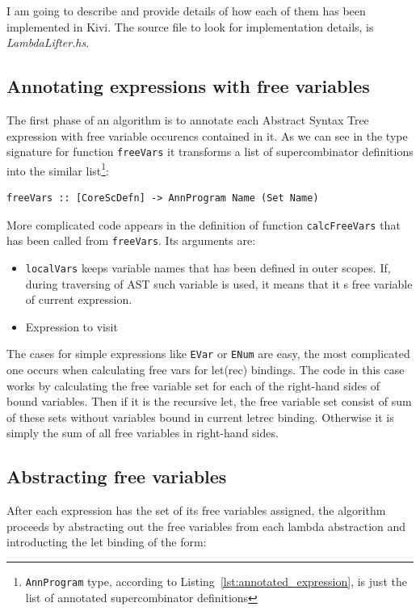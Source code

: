 \documentclass[12pt,a4paper]{report}
\begin{document}
I am going to describe and provide details of how each of them has been
implemented in Kivi. The source file to look for implementation details, is
\textit{LambdaLifter.hs}.

\subsection{Annotating expressions with free variables}
The first phase of an algorithm is to annotate each Abstract Syntax Tree
expression with free variable occurencs contained in it. As we can see in the
type signature for function \texttt{freeVars} it transforms a list of
supercombinator definitions into the similar list\footnote{\texttt{AnnProgram}
type, according to Listing~\ref{lst:annotated_expression}, is just the list of
annotated supercombinator definitions}:

\vspace*{0.2in}
\begin{lstlisting}[style=haskell]
freeVars :: [CoreScDefn] -> AnnProgram Name (Set Name)
\end{lstlisting}

More complicated code appears in the definition of function
\texttt{calcFreeVars} that has been called from \texttt{freeVars}. Its
arguments are:
\begin{itemize}
  \item \texttt{localVars} keeps variable names that has been defined in outer
    scopes. If, during traversing of AST such variable is used, it means that
    it s free variable of current expression.
  \item Expression to visit
\end{itemize}

The cases for simple expressions like \texttt{EVar} or \texttt{ENum} are easy,
the most complicated one occurs when calculating free vars for
let(rec) bindings. The code in this case works by calculating the free
variable set for each of the right-hand sides of bound variables. Then if it is
the recursive let, the free variable set consist of sum of these sets without
variables bound in current letrec binding. Otherwise it is simply the
sum of all free variables in right-hand sides.

\subsection{Abstracting free variables}
After each expression has the set of its free variables assigned, the algorithm
proceeds by abstracting out the free variables from each lambda abstraction and
introducting the let binding of the form:
\end{document}
